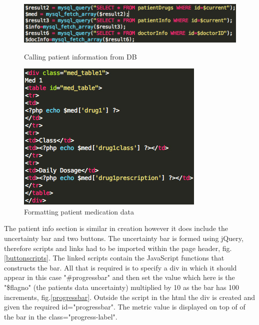 \documentclass[11pt]{article}
\begin{document}
\begin{figure}
\centering
\includegraphics[width=\linewidth]{infoSQL.png}
\caption{Calling patient information from DB \label{infoSQL}}
\includegraphics[width=\linewidth]{medtable.png}
\caption{Formatting patient medication data \label{medtable}}
\end{figure} 
The patient info section is similar in creation however it does include the uncertainty bar and two buttons. The uncertainty bar is formed using jQuery, therefore scripts and links had to be imported within the page header, fig.\ref{buttonscripts}. The linked scripts contain the JavaScript functions that constructs the bar. All that is required is to specify a div in which it should appear in this case "\#progressbar" and then set the value which here is the "\$flagno" (the patients data uncertainty) multiplied by 10 as the bar has 100 increments, fig.\ref{progressbar}. Outside the script in the html the div is created and given the required id="progressbar". The metric value is displayed on top of of the bar in the class="progress-label". 
\end{document}
